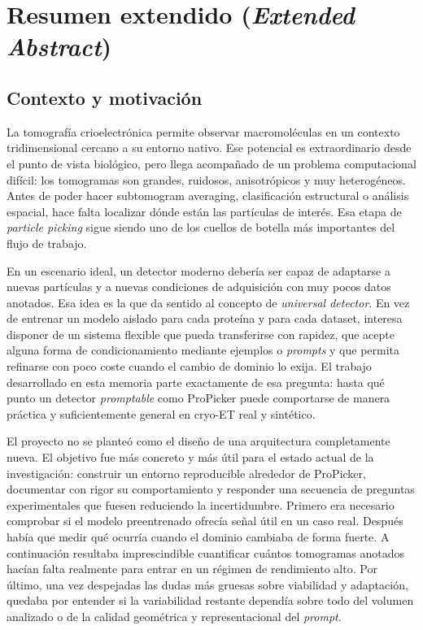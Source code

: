 \documentclass[12pt,a4paper]{report}
\begin{document}
\cleardoublepage

\chapter*{Resumen extendido (\textit{Extended Abstract})}

\section*{Contexto y motivación}
La tomografía crioelectrónica permite observar macromoléculas en un contexto tridimensional cercano a su entorno nativo. Ese potencial es extraordinario desde el punto de vista biológico, pero llega acompañado de un problema computacional difícil: los tomogramas son grandes, ruidosos, anisotrópicos y muy heterogéneos. Antes de poder hacer subtomogram averaging, clasificación estructural o análisis espacial, hace falta localizar dónde están las partículas de interés. Esa etapa de \emph{particle picking} sigue siendo uno de los cuellos de botella más importantes del flujo de trabajo.

En un escenario ideal, un detector moderno debería ser capaz de adaptarse a nuevas partículas y a nuevas condiciones de adquisición con muy pocos datos anotados. Esa idea es la que da sentido al concepto de \emph{universal detector}. En vez de entrenar un modelo aislado para cada proteína y para cada dataset, interesa disponer de un sistema flexible que pueda transferirse con rapidez, que acepte alguna forma de condicionamiento mediante ejemplos o \emph{prompts} y que permita refinarse con poco coste cuando el cambio de dominio lo exija. El trabajo desarrollado en esta memoria parte exactamente de esa pregunta: hasta qué punto un detector \emph{promptable} como ProPicker puede comportarse de manera práctica y suficientemente general en cryo-ET real y sintético.

El proyecto no se planteó como el diseño de una arquitectura completamente nueva. El objetivo fue más concreto y más útil para el estado actual de la investigación: construir un entorno reproducible alrededor de ProPicker, documentar con rigor su comportamiento y responder una secuencia de preguntas experimentales que fuesen reduciendo la incertidumbre. Primero era necesario comprobar si el modelo preentrenado ofrecía señal útil en un caso real. Después había que medir qué ocurría cuando el dominio cambiaba de forma fuerte. A continuación resultaba imprescindible cuantificar cuántos tomogramas anotados hacían falta realmente para entrar en un régimen de rendimiento alto. Por último, una vez despejadas las dudas más gruesas sobre viabilidad y adaptación, quedaba por entender si la variabilidad restante dependía sobre todo del volumen analizado o de la calidad geométrica y representacional del \emph{prompt}.
\end{document}
